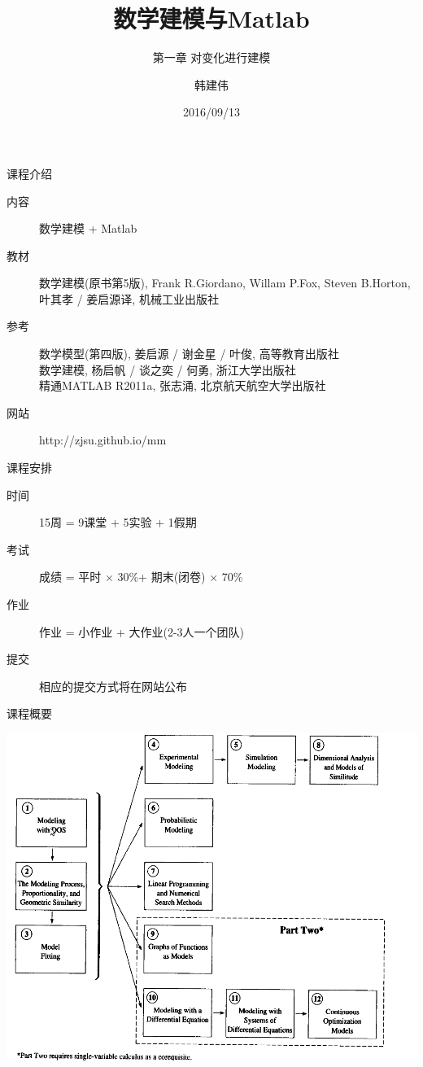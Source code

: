 \documentclass{beamer}
\title{数学建模与Matlab}
\subtitle{第一章 对变化进行建模}
\author{韩建伟}
\institute{
  信息学院\\
  \texttt{mm@hanjianwei.com}
}
\date{2016/09/13}
\begin{document}
\begin{frame}[plain]
  \titlepage{}
\end{frame}

\begin{frame}{课程介绍}

\begin{description}
\item[内容] 数学建模 + Matlab
\item[教材] 数学建模(原书第5版), Frank R.Giordano, Willam P.Fox, Steven B.Horton, 叶其孝 / 姜启源译, 机械工业出版社
\item[参考] 数学模型(第四版), 姜启源 / 谢金星 / 叶俊, 高等教育出版社\\
  数学建模, 杨启帆 / 谈之奕 / 何勇, 浙江大学出版社\\
  精通MATLAB R2011a, 张志涌, 北京航天航空大学出版社
\item[网站] http://zjsu.github.io/mm
\end{description}
  
\end{frame}

\begin{frame}{课程安排}
  \begin{description}
  \item[时间] 15周 = 9课堂 + 5实验 + 1假期
  \item[考试] 成绩 = 平时 $\times$ 30\%+ 期末(闭卷) $\times$ 70\%
  \item[作业] 作业 = 小作业 + 大作业(2-3人一个团队)
  \item[提交] 相应的提交方式将在网站公布
  \end{description}
\end{frame}

\begin{frame}{课程概要}
  \begin{center}
    \includegraphics[width=.8\textwidth{}]{book-overview.png}
  \end{center}
\end{frame}
\end{document}
